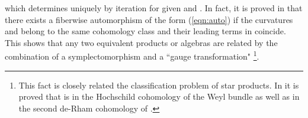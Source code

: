 \documentclass[10pt,a4paper]{article}
\def\h{\hbar}
\begin{document}
which determines \coordHE{} uniquely by iteration for given \coordHE{} and \coordHE{}.
 In fact, it is proved in \cite{Fedbk} that there exists a fiberwise automorphism of the form (\ref{eqn:auto}) if the curvatures \myHighlight{$\Omega$}\coordHE{} and \coordHE{} belong to the same cohomology class and their leading terms in \myHighlight{$\h$}\coordHE{} coincide. 
This shows that any two equivalent \myHighlight{$*$}\coordHE{} products or algebras \myHighlight{$(C^\infty(M)[[\h]]\otimes {\cal A},*)$}\coordHE{} are related by the combination of a symplectomorphism and a ``gauge transformation"
\footnote{This fact is closely related the classification problem of star products. In \cite{WX} it is proved that \myHighlight{$[\Omega]$}\coordHE{} is in the Hochschild cohomology of the Weyl bundle as well as in the second de-Rham cohomology of \coordHE{}.
}. \\
\end{document}
